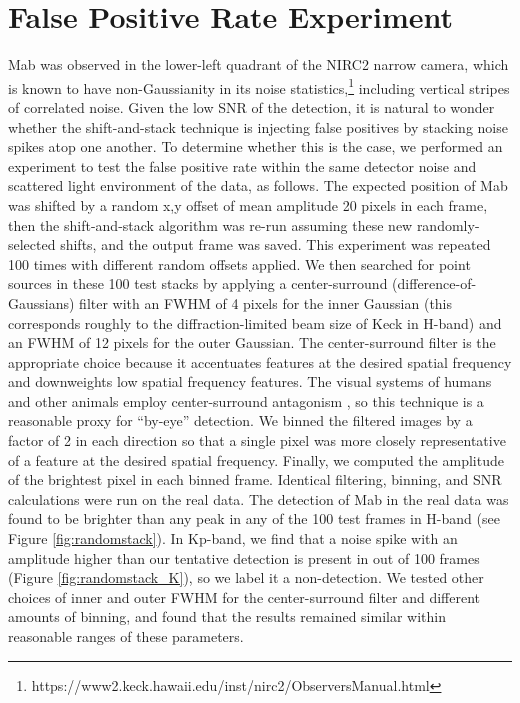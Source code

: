 \documentclass[preprint]{aastex631}
\begin{document}
\section{False Positive Rate Experiment}
\label{s:falsepositives}

Mab was observed in the lower-left quadrant of the NIRC2 narrow camera, which is known to have non-Gaussianity in its noise statistics,\footnote{https://www2.keck.hawaii.edu/inst/nirc2/ObserversManual.html} including vertical stripes of correlated noise. Given the low SNR of the detection, it is natural to wonder whether the shift-and-stack technique is injecting false positives by stacking noise spikes atop one another. To determine whether this is the case, we performed an experiment to test the false positive rate within the same detector noise and scattered light environment of the data, as follows. The expected position of Mab was shifted by a random x,y offset of mean amplitude 20 pixels in each frame, then the shift-and-stack algorithm was re-run assuming these new randomly-selected shifts, and the output frame was saved. This experiment was repeated 100 times with different random offsets applied. We then searched for point sources in these 100 test stacks by applying a center-surround (difference-of-Gaussians) filter with an FWHM of 4 pixels for the inner Gaussian (this corresponds roughly to the diffraction-limited beam size of Keck in H-band) and an FWHM of 12 pixels for the outer Gaussian. The center-surround filter is the appropriate choice because it accentuates features at the desired spatial frequency and downweights low spatial frequency features. The visual systems of humans and other animals employ center-surround antagonism \citep{graham06}, so this technique is a reasonable proxy for ``by-eye'' detection. We binned the filtered images by a factor of 2 in each direction so that a single pixel was more closely representative of a feature at the desired spatial frequency. Finally, we computed the amplitude of the brightest pixel in each binned frame. Identical filtering, binning, and SNR calculations were run on the real data. The detection of Mab in the real data was found to be brighter than any peak in any of the 100 test frames in H-band (see Figure \ref{fig:randomstack}). In Kp-band, we find that a noise spike with an amplitude higher than our tentative detection is present in  out of 100 frames (Figure \ref{fig:randomstack_K}), so we label it a non-detection. We tested other choices of inner and outer FWHM for the center-surround filter and different amounts of binning, and found that the results remained similar within reasonable ranges of these parameters. 
\end{document}
